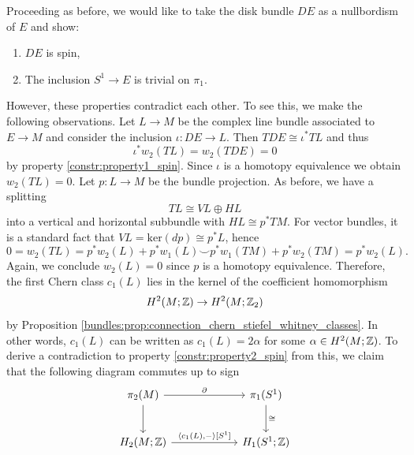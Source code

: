 \noindent Proceeding as before, we would like to take the disk bundle $DE$ as a nullbordism of $E$ and show:
\begin{enumerate}[label=(\Roman*)]
	\item \label{constr:property1_spin} $DE$ is spin,
	\item \label{constr:property2_spin} The inclusion $S^1 \to E$ is trivial on $\pi_1$.
\end{enumerate}
However, these properties contradict each other. To see this, we make the following observations. Let $L \to M$ be the complex line bundle associated to $E \to M$ and consider the inclusion $\iota \colon DE \to L$. Then $TDE \cong \iota^\ast TL$ and thus 
\[
\iota^\ast w_2(TL) = w_2(TDE) = 0
\]
by property \ref{constr:property1_spin}. Since $\iota$ is a homotopy equivalence we obtain $w_2(TL) = 0$. Let $p \colon L \to M$ be the bundle projection. As before, we have a splitting 
\[
TL \cong VL \oplus HL
\]
into a vertical and horizontal subbundle with $HL \cong p^\ast TM$. For vector bundles, it is a standard fact that $VL = \mathrm{ker}(dp) \cong p^\ast L$, hence 
\[
0 = w_2(TL) = p^\ast w_2(L) + p^\ast w_1(L) \smile p^\ast w_1(TM) + p^\ast w_2(TM) = p^\ast w_2(L).
\]
Again, we conclude $w_2(L) = 0$ since $p$ is a homotopy equivalence. Therefore, the first Chern class $c_1(L)$ lies in the kernel of the coefficient homomorphism
\[
H^2(M;\mathbb{Z}) \to H^2(M;\mathbb{Z}_2)
\]
by Proposition \ref{bundles:prop:connection_chern_stiefel_whitney_classes}. In other words, $c_1(L)$ can be written as $c_1(L) = 2 \alpha$ for some \linebreak$\alpha \in H^2(M;\mathbb{Z})$. To derive a contradiction to property \ref{constr:property2_spin} from this, we claim that the following diagram commutes up to sign
\[
\begin{tikzcd}[column sep=6em,row sep=2.5em]
    {\pi_2(M)} & {\pi_1(S^1)} \\
    {H_2(M;\Z)} & {H_1(S^1;\Z)}
    \arrow["\partial", from=1-1, to=1-2]
    \arrow[from=1-1, to=2-1]
    \arrow["\cong", from=1-2, to=2-2]
    \arrow["{\langle c_1(L),-\rangle [S^1]}", from=2-1, to=2-2]
\end{tikzcd}
\]
